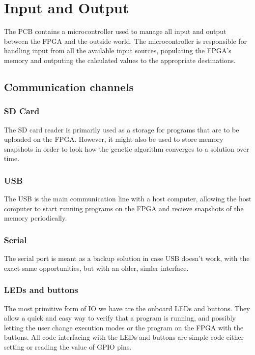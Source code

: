 \section{Input and Output}
The PCB contains a microcontroller used to manage all input and output between the FPGA and the outside world.
The microcontroller is responsible for handling input from all the available input sources, populating the FPGA's memory and outputing the calculated values to the appropriate destinations.

\subsection{Communication channels}
\subsubsection{SD Card}
The SD card reader is primarily used as a storage for programs that are to be uploaded on the FPGA.
However, it might also be used to store memory snapshots in order to look how the genetic algorithm converges to a solution over time.

\subsubsection{USB}
The USB is the main communication line with a host computer, allowing the host computer to start running programs on the FPGA and recieve snapshots of the memory periodically.

\subsubsection{Serial}
The serial port is meant as a backup solution in case USB doesn't work, with the exact same opportunities, but with an older, simler interface.

\subsubsection{LEDs and buttons}
The most primitive form of IO we have are the onboard LEDs and buttons.
They allow a quick and easy way to verify that a program is running, and possibly letting the user change execution modes or the program on the FPGA with the buttons.
All code interfacing with the LEDs and buttons are simple code either setting or reading the value of GPIO pins.


